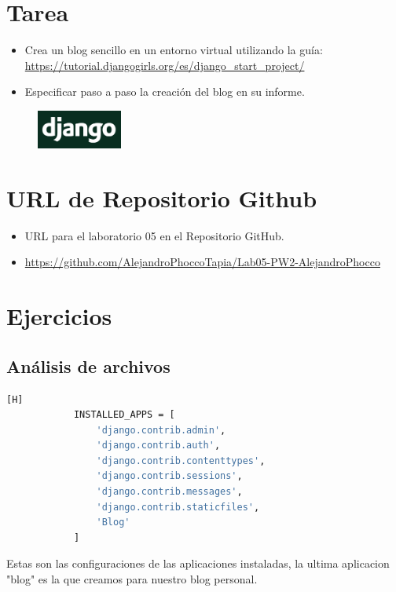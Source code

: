 \documentclass{article}
\begin{document}
	\section{Tarea}
	\begin{itemize}		
		\item Crea un blog sencillo en un entorno virtual utilizando la guía: \url{https://tutorial.djangogirls.org/es/django_start_project/}
            \item Especificar paso a paso la creación del blog en su informe.
	\end{itemize}
        \begin{figure}[H]
		\centering
		\includegraphics[width=0.25\textwidth,keepaspectratio]{img/django.png}
	\end{figure}

	\section{URL de Repositorio Github}
	\begin{itemize}
		\item URL para el laboratorio 05 en el Repositorio GitHub.
		\item \url{https://github.com/AlejandroPhoccoTapia/Lab05-PW2-AlejandroPhocco}
	\end{itemize}
	
	\section{Ejercicios}
 
 
	\subsection{Análisis de archivos }
 
        
	\begin{lstlisting}[language=bash,caption={Analizando bloque 1 de settings.py}][H]
            INSTALLED_APPS = [
                'django.contrib.admin',
                'django.contrib.auth',
                'django.contrib.contenttypes',
                'django.contrib.sessions',
                'django.contrib.messages',
                'django.contrib.staticfiles',
                'Blog'
            ]
	\end{lstlisting}
        Estas son las configuraciones de las aplicaciones instaladas, la ultima aplicacion "blog" es la que creamos para nuestro blog personal.
        
\end{document}
